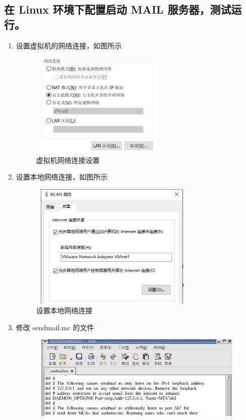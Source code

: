 \documentclass{article}
\begin{document}
\subsection{在 Linux 环境下配置启动 MAIL 服务器，测试运行。}
\begin{enumerate}
\item 设置虚拟机的网络连接，如图所示\\
\begin{figure}[h]
    \centering
    \includegraphics[width=6.5cm,height=5cm]{5.png}
    \caption{虚拟机网络连接设置}
\end{figure}
\newpage
\item 设置本地网络连接，如图所示\\
\begin{figure}[h]
    \centering
    \includegraphics[width=8cm,height=6cm]{6.png}
    \caption{设置本地网络连接}
\end{figure}
\item 修改 sendmail.mc 的文件\\
\begin{figure}[h]
    \centering
    \includegraphics[width=11cm,height=4cm]{7.png}

\end{figure}
\end{enumerate}
\end{document}
